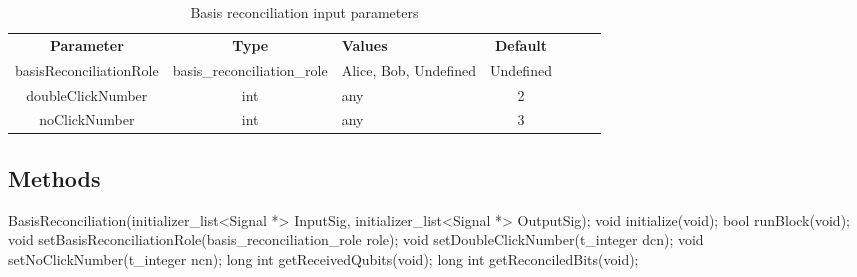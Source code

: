 
\begin{table}[h]
	\centering
	\begin{tabular}{|c|c|p{40mm}|c|ccp{60mm}}
		\cline{1-4}
		\textbf{Parameter} & \textbf{Type} & \textbf{Values} &   \textbf{Default}& \\ \cline{1-4}
		basisReconciliationRole & basis\_reconciliation\_role & Alice, Bob, Undefined &  Undefined \\ \cline{1-4}
		doubleClickNumber & int & any & 2 \\ \cline{1-4}
		noClickNumber & int &  any & 3 \\ \cline{1-4}
	\end{tabular}
	\caption{Basis reconciliation input parameters}
	\label{table:basis_recon_in_par}
\end{table}

\subsection*{Methods}

\indent BasisReconciliation(initializer\_list<Signal *> InputSig, initializer\_list<Signal *> OutputSig);
\bigbreak	
void initialize(void);
\bigbreak	
bool runBlock(void);
\bigbreak
void setBasisReconciliationRole(basis\_reconciliation\_role role);
\bigbreak
void setDoubleClickNumber(t\_integer dcn);
\bigbreak
void setNoClickNumber(t\_integer ncn);
\bigbreak
long int getReceivedQubits(void);
\bigbreak
long int getReconciledBits(void);

